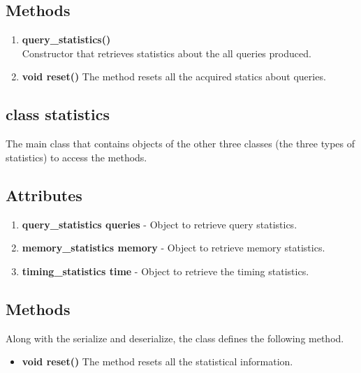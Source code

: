 \subsection*{Methods}
\begin{enumerate}
 \item \textbf{query\_statistics()} \\
	Constructor that retrieves statistics about the all queries produced.
 \item \textbf{void reset()}
	The method resets all the acquired statics about queries.
\end{enumerate}

\subsection{class statistics}
The main class that contains objects of the other three classes (the three types of statistics) to access the methods. 
\subsection*{Attributes}
\begin{enumerate}
 \item \textbf{query\_statistics queries} - Object to retrieve query statistics.
 \item \textbf{memory\_statistics memory} - Object to retrieve memory statistics.
 \item \textbf{timing\_statistics time} - Object to retrieve the timing statistics.
\end{enumerate}
\subsection*{Methods}
Along with the serialize and deserialize, the class defines the following method.
\begin{itemize}
 \item \textbf{void reset()}
	The method resets all the statistical information.
\end{itemize}
